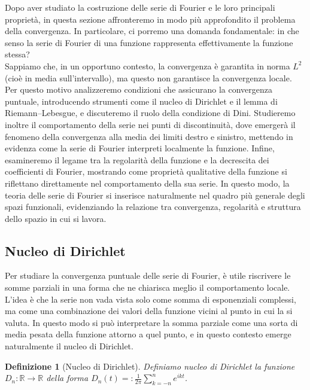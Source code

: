 \documentclass[a4paper,12pt]{report}
\newtheorem{definizione}{Definizione}[chapter]
\begin{document}
Dopo aver studiato la costruzione delle serie di Fourier e le loro principali proprietà, in questa sezione affronteremo in modo più approfondito il problema della convergenza. In particolare, ci porremo una domanda fondamentale: in che senso la serie di Fourier di una funzione rappresenta effettivamente la funzione stessa?
\\Sappiamo che, in un opportuno contesto, la convergenza è garantita in norma $L^2$ (cioè in media sull’intervallo), ma questo non garantisce la convergenza locale. Per questo motivo analizzeremo condizioni che assicurano la convergenza puntuale, introducendo strumenti come il nucleo di Dirichlet e il lemma di Riemann–Lebesgue, e discuteremo il ruolo della condizione di Dini. Studieremo inoltre il comportamento della serie nei punti di discontinuità, dove emergerà il fenomeno della convergenza alla media dei limiti destro e sinistro, mettendo in evidenza come la serie di Fourier interpreti localmente la funzione. Infine, esamineremo il legame tra la regolarità della funzione e la decrescita dei coefficienti di Fourier, mostrando come proprietà qualitative della funzione si riflettano direttamente nel comportamento della sua serie. In questo modo, la teoria delle serie di Fourier si inserisce naturalmente nel quadro più generale degli spazi funzionali, evidenziando la relazione tra convergenza, regolarità e struttura dello spazio in cui si lavora.

\subsection{Nucleo di Dirichlet}

Per studiare la convergenza puntuale delle serie di Fourier, è utile riscrivere le somme parziali in una forma che ne chiarisca meglio il comportamento locale. L’idea è che la serie non vada vista solo come somma di esponenziali complessi, ma come una combinazione dei valori della funzione vicini al punto in cui la si valuta. In questo modo si può interpretare la somma parziale come una sorta di media pesata della funzione attorno a quel punto, e in questo contesto emerge naturalmente il nucleo di Dirichlet.

\begin{definizione}[Nucleo di Dirichlet]
    Definiamo nucleo di Dirichlet la funzione 
    \\$D_n: \mathbb{R}\to\mathbb{R}$ della forma $D_n(t)=:\displaystyle\frac{1}{2\pi}\sum_{k=-n}^n e^{ikt}$.
\end{definizione}
\end{document}
